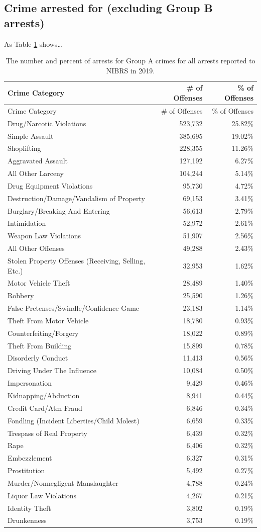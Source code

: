\documentclass[
  12pt,
  openany]{book}
\begin{document}
\hypertarget{crime-arrested-for-excluding-group-b-arrests}{%
\subsection{Crime arrested for (excluding Group B arrests)}\label{crime-arrested-for-excluding-group-b-arrests}}

As Table \ref{tab:arresteeCrime} shows\ldots{}

\begin{longtable}[]{@{}lrr@{}}
\caption{\label{tab:arresteeCrime}The number and percent of arrests for Group A crimes for all arrests reported to NIBRS in 2019.}\tabularnewline
\toprule
Crime Category & \# of Offenses & \% of Offenses\tabularnewline
\midrule
\endfirsthead
\toprule
Crime Category & \# of Offenses & \% of Offenses\tabularnewline
\midrule
\endhead
Drug/Narcotic Violations & 523,732 & 25.82\%\tabularnewline
Simple Assault & 385,695 & 19.02\%\tabularnewline
Shoplifting & 228,355 & 11.26\%\tabularnewline
Aggravated Assault & 127,192 & 6.27\%\tabularnewline
All Other Larceny & 104,244 & 5.14\%\tabularnewline
Drug Equipment Violations & 95,730 & 4.72\%\tabularnewline
Destruction/Damage/Vandalism of Property & 69,153 & 3.41\%\tabularnewline
Burglary/Breaking And Entering & 56,613 & 2.79\%\tabularnewline
Intimidation & 52,972 & 2.61\%\tabularnewline
Weapon Law Violations & 51,907 & 2.56\%\tabularnewline
All Other Offenses & 49,288 & 2.43\%\tabularnewline
Stolen Property Offenses (Receiving, Selling, Etc.) & 32,953 & 1.62\%\tabularnewline
Motor Vehicle Theft & 28,489 & 1.40\%\tabularnewline
Robbery & 25,590 & 1.26\%\tabularnewline
False Pretenses/Swindle/Confidence Game & 23,183 & 1.14\%\tabularnewline
Theft From Motor Vehicle & 18,780 & 0.93\%\tabularnewline
Counterfeiting/Forgery & 18,022 & 0.89\%\tabularnewline
Theft From Building & 15,899 & 0.78\%\tabularnewline
Disorderly Conduct & 11,413 & 0.56\%\tabularnewline
Driving Under The Influence & 10,084 & 0.50\%\tabularnewline
Impersonation & 9,429 & 0.46\%\tabularnewline
Kidnapping/Abduction & 8,941 & 0.44\%\tabularnewline
Credit Card/Atm Fraud & 6,846 & 0.34\%\tabularnewline
Fondling (Incident Liberties/Child Molest) & 6,659 & 0.33\%\tabularnewline
Trespass of Real Property & 6,439 & 0.32\%\tabularnewline
Rape & 6,406 & 0.32\%\tabularnewline
Embezzlement & 6,327 & 0.31\%\tabularnewline
Prostitution & 5,492 & 0.27\%\tabularnewline
Murder/Nonnegligent Manslaughter & 4,788 & 0.24\%\tabularnewline
Liquor Law Violations & 4,267 & 0.21\%\tabularnewline
Identity Theft & 3,802 & 0.19\%\tabularnewline
Drunkenness & 3,753 & 0.19\%\tabularnewline

\end{longtable}
\end{document}
